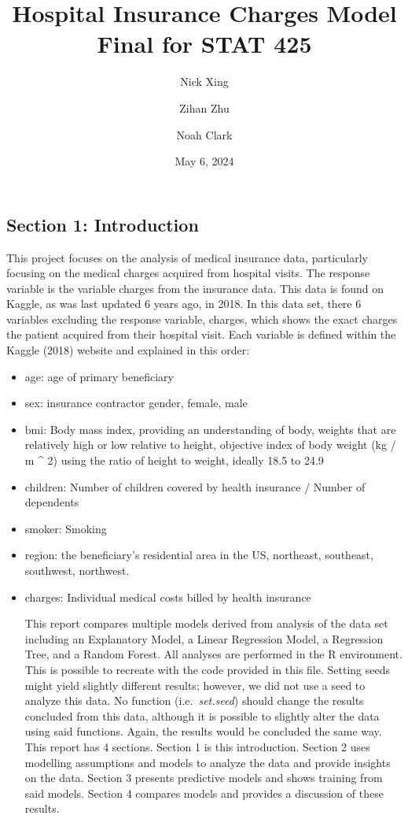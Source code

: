 \documentclass[
  12pt,
]{article}
\title{Hospital Insurance Charges Model \vspace{0.5cm}\\
Final for STAT 425}
\author{Nick Xing \and Zihan Zhu \and Noah Clark}
\date{May 6, 2024}
\begin{document}
\maketitle

{
\setcounter{tocdepth}{3}
\tableofcontents
}
\newpage

\subsection{Section 1: Introduction}\label{section-1-introduction}

This project focuses on the analysis of medical insurance data,
particularly focusing on the medical charges acquired from hospital
visits. The response variable is the variable charges from the insurance
data. This data is found on Kaggle, as was last updated 6 years ago, in
2018. In this data set, there 6 variables excluding the response
variable, charges, which shows the exact charges the patient acquired
from their hospital visit. Each variable is defined within the Kaggle
(2018) website and explained in this order:

\begin{itemize}
\item
  age: age of primary beneficiary
\item
  sex: insurance contractor gender, female, male
\item
  bmi: Body mass index, providing an understanding of body, weights that
  are relatively high or low relative to height, objective index of body
  weight (kg / m \^{} 2) using the ratio of height to weight, ideally
  18.5 to 24.9
\item
  children: Number of children covered by health insurance / Number of
  dependents
\item
  smoker: Smoking
\item
  region: the beneficiary's residential area in the US, northeast,
  southeast, southwest, northwest.
\item
  charges: Individual medical costs billed by health insurance

  This report compares multiple models derived from analysis of the data
  set including an Explanatory Model, a Linear Regression Model, a
  Regression Tree, and a Random Forest. All analyses are performed in
  the R environment. This is possible to recreate with the code provided
  in this file. Setting seeds might yield slightly different results;
  however, we did not use a seed to analyze this data. No function
  (i.e.~\emph{set.seed}) should change the results concluded from this
  data, although it is possible to slightly alter the data using said
  functions. Again, the results would be concluded the same way. This
  report has 4 sections. Section 1 is this introduction. Section 2 uses
  modelling assumptions and models to analyze the data and provide
  insights on the data. Section 3 presents predictive models and shows
  training from said models. Section 4 compares models and provides a
  discussion of these results.
\end{itemize}
\end{document}
